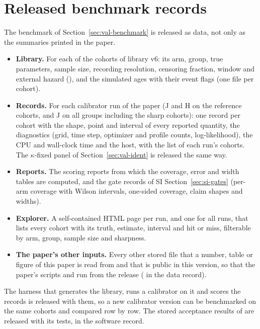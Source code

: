 \section{Released benchmark records}\label{si:records}

The benchmark of Section~\ref{sec:val-benchmark} is released as data, not only as the summaries printed in the paper.
\begin{itemize}[leftmargin=1.5em,itemsep=1pt]
  \item \textbf{Library.} For each of the  cohorts of library v6: its arm, group, true parameters,
    sample size, recording resolution, censoring fraction, window and external hazard (), and the
    simulated ages with their event flags (one file per cohort).
  \item \textbf{Records.} For each calibrator run of the paper (J and H on the reference cohorts, and J on all groups
    including the sharp cohorts): one record per cohort with the shape, point and interval of every reported quantity,
    the diagnostics (grid, time step, optimizer and profile counts, log-likelihood), the CPU and wall-clock time and the
    host, with the list of each run's cohorts. The $\kappa$-fixed panel of Section~\ref{sec:val-ident} is released the
    same way.
  \item \textbf{Reports.} The scoring reports from which the coverage, error and width tables are computed, and the
    gate records of SI Section~\ref{sec:si-gates} (per-arm coverage with Wilson intervals, one-sided coverage, claim
    shapes and widths).
  \item \textbf{Explorer.} A self-contained HTML page per run, and one for all runs, that lists every cohort with its
    truth, estimate, interval and hit or miss, filterable by arm, group, sample size and sharpness.
  \item \textbf{The paper's other inputs.} Every other stored file that a number, table or figure of this paper is read
    from and that is public in this version, so that the paper's scripts and  run from the
    release ( in the data record).
\end{itemize}
The harness that generates the library, runs a calibrator on it and scores the records is released with them, so a
new calibrator version can be benchmarked on the same cohorts and compared row by row. The stored acceptance results of
 are released with its tests, in the software record.
